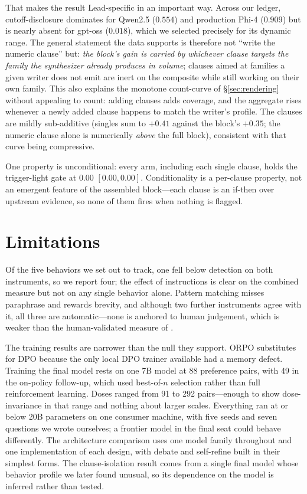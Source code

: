 \documentclass[11pt]{article}
\begin{document}
That makes the result Lead-specific in an important way. Across our ledger,
cutoff-disclosure dominates for Qwen2.5 ($0.554$) and production Phi-4
($0.909$) but is nearly absent for gpt-oss ($0.018$), which we selected
precisely for its dynamic range. The general statement the data supports is
therefore not ``write the numeric clause'' but: \emph{the block's gain is
carried by whichever clause targets the family the synthesizer already
produces in volume}; clauses aimed at families a given writer does not emit
are inert on the composite while still working on their own family. This
also explains the monotone count-curve of \S\ref{sec:rendering} without
appealing to count: adding clauses adds coverage, and the aggregate rises
whenever a newly added clause happens to match the writer's profile. The
clauses are mildly sub-additive (singles sum to $+0.41$ against the block's
$+0.35$; the numeric clause alone is numerically \emph{above} the full
block), consistent with that curve being compressive.

One property is unconditional: every arm, including each single clause,
holds the trigger-light gate at $0.00$ $[0.00,0.00]$. Conditionality is a
per-clause property, not an emergent feature of the assembled block---each
clause is an if-then over upstream evidence, so none of them fires when
nothing is flagged.

\section{Limitations}
\label{sec:limits}
Of the five behaviors we set out to track, one fell below detection on both
instruments, so we report four; the effect of instructions is clear on the
combined measure but not on any single behavior alone. Pattern matching misses
paraphrase and rewards brevity, and although two further instruments agree
with it, all three are automatic---none is anchored to human judgement, which
is weaker than the human-validated measure of \cite{certdist}.

The training results are narrower than the null they support. ORPO substitutes
for DPO because the only local DPO trainer available had a memory defect.
Training the final model rests on one 7B model at 88 preference pairs, with 49
in the on-policy follow-up, which used best-of-$n$ selection rather than full
reinforcement learning. Doses ranged from 91 to 292 pairs---enough to show
dose-invariance in that range and nothing about larger scales. Everything ran
at or below 20B parameters on one consumer machine, with five seeds and seven
questions we wrote ourselves; a frontier model in the final seat could behave
differently. The architecture comparison uses one model family throughout and
one implementation of each design, with debate and self-refine built in their
simplest forms. The clause-isolation result comes from a single final model
whose behavior profile we later found unusual, so its dependence on the model
is inferred rather than tested.
\end{document}
